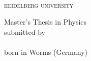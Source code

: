 \begin{whole}
	\centering
	{}
	\\[.8cm]
	{\firalight\fontsize{36}{48}\selectfont\scshape\MakeLowercase{Heidelberg University}}
	
	\vfill
	
	Master's Thesis in Physics\\
	submitted by\\
	\vspace{0.5cm}
	\\
	\vspace{0.5cm} \rmfamily 
	born in Worms (Germany)\\
	\vspace{0.5cm}
\end{whole}